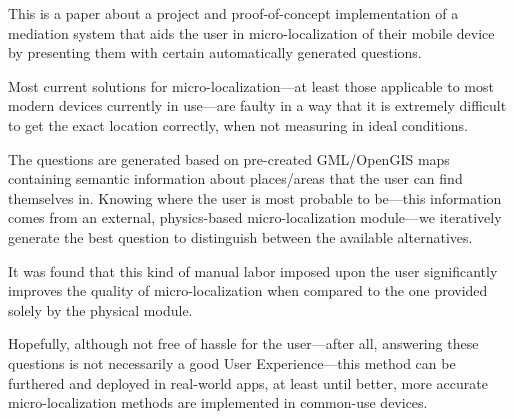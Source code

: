 This is a paper about a project and proof-of-concept implementation of a mediation system that aids the user in micro-localization of their mobile device by presenting them with certain automatically generated questions.

Most current solutions for micro-localization---at least those applicable to most modern devices currently in use---are faulty in a way that it is extremely difficult to get the exact location correctly, when not measuring in ideal conditions.

The questions are generated based on pre-created GML/OpenGIS maps containing semantic information about places/areas that the user can find themselves in. Knowing where the user is most probable to be---this information comes from an external, physics-based micro-localization module---we iteratively generate the best question to distinguish between the available alternatives.

It was found that this kind of manual labor imposed upon the user significantly improves the quality of micro-localization when compared to the one provided solely by the physical module.

Hopefully, although not free of hassle for the user---after all, answering these questions is not necessarily a good User Experience---this method can be furthered and deployed in real-world apps, at least until better, more accurate micro-localization methods are implemented in common-use devices.
